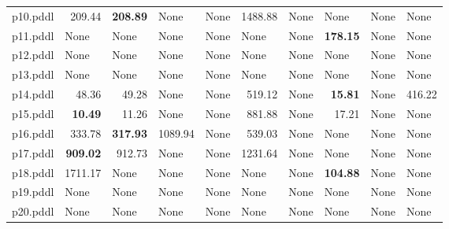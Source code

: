 \documentclass{article}
\begin{document}
\begin{tabular}{@{}lrrrrrrrrr@{}}
p10.pddl & 209.44 & \textbf{208.89} & \multicolumn{1}{|l|}{None} & \multicolumn{1}{|l|}{None} & 1488.88 & \multicolumn{1}{|l|}{None} & \multicolumn{1}{|l|}{None} & \multicolumn{1}{|l|}{None} & \multicolumn{1}{|l|}{None} \\
p11.pddl & \multicolumn{1}{|l|}{None} & \multicolumn{1}{|l|}{None} & \multicolumn{1}{|l|}{None} & \multicolumn{1}{|l|}{None} & \multicolumn{1}{|l|}{None} & \multicolumn{1}{|l|}{None} & \textbf{178.15} & \multicolumn{1}{|l|}{None} & \multicolumn{1}{|l|}{None} \\
p12.pddl & \multicolumn{1}{|l|}{None} & \multicolumn{1}{|l|}{None} & \multicolumn{1}{|l|}{None} & \multicolumn{1}{|l|}{None} & \multicolumn{1}{|l|}{None} & \multicolumn{1}{|l|}{None} & \multicolumn{1}{|l|}{None} & \multicolumn{1}{|l|}{None} & \multicolumn{1}{|l|}{None} \\
p13.pddl & \multicolumn{1}{|l|}{None} & \multicolumn{1}{|l|}{None} & \multicolumn{1}{|l|}{None} & \multicolumn{1}{|l|}{None} & \multicolumn{1}{|l|}{None} & \multicolumn{1}{|l|}{None} & \multicolumn{1}{|l|}{None} & \multicolumn{1}{|l|}{None} & \multicolumn{1}{|l|}{None} \\
p14.pddl & 48.36 & 49.28 & \multicolumn{1}{|l|}{None} & \multicolumn{1}{|l|}{None} & 519.12 & \multicolumn{1}{|l|}{None} & \textbf{15.81} & \multicolumn{1}{|l|}{None} & 416.22 \\
p15.pddl & \textbf{10.49} & 11.26 & \multicolumn{1}{|l|}{None} & \multicolumn{1}{|l|}{None} & 881.88 & \multicolumn{1}{|l|}{None} & 17.21 & \multicolumn{1}{|l|}{None} & \multicolumn{1}{|l|}{None} \\
p16.pddl & 333.78 & \textbf{317.93} & 1089.94 & \multicolumn{1}{|l|}{None} & 539.03 & \multicolumn{1}{|l|}{None} & \multicolumn{1}{|l|}{None} & \multicolumn{1}{|l|}{None} & \multicolumn{1}{|l|}{None} \\
p17.pddl & \textbf{909.02} & 912.73 & \multicolumn{1}{|l|}{None} & \multicolumn{1}{|l|}{None} & 1231.64 & \multicolumn{1}{|l|}{None} & \multicolumn{1}{|l|}{None} & \multicolumn{1}{|l|}{None} & \multicolumn{1}{|l|}{None} \\
p18.pddl & 1711.17 & \multicolumn{1}{|l|}{None} & \multicolumn{1}{|l|}{None} & \multicolumn{1}{|l|}{None} & \multicolumn{1}{|l|}{None} & \multicolumn{1}{|l|}{None} & \textbf{104.88} & \multicolumn{1}{|l|}{None} & \multicolumn{1}{|l|}{None} \\
p19.pddl & \multicolumn{1}{|l|}{None} & \multicolumn{1}{|l|}{None} & \multicolumn{1}{|l|}{None} & \multicolumn{1}{|l|}{None} & \multicolumn{1}{|l|}{None} & \multicolumn{1}{|l|}{None} & \multicolumn{1}{|l|}{None} & \multicolumn{1}{|l|}{None} & \multicolumn{1}{|l|}{None} \\
p20.pddl & \multicolumn{1}{|l|}{None} & \multicolumn{1}{|l|}{None} & \multicolumn{1}{|l|}{None} & \multicolumn{1}{|l|}{None} & \multicolumn{1}{|l|}{None} & \multicolumn{1}{|l|}{None} & \multicolumn{1}{|l|}{None} & \multicolumn{1}{|l|}{None} & \multicolumn{1}{|l|}{None} \\
\end{tabular}
\end{document}
